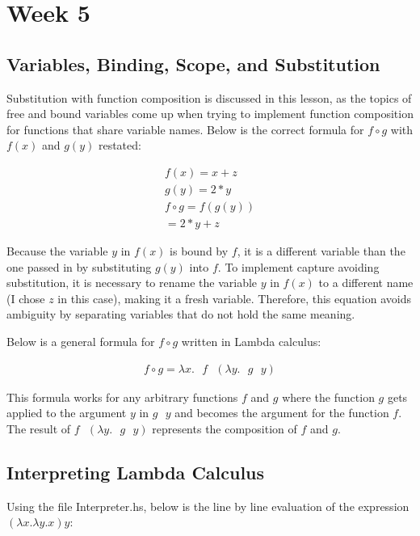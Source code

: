 \documentclass{article}
\theoremstyle{theorem}
\theoremstyle{definition}
\theoremstyle{remark}
\begin{document}
\section{Week 5}

\subsection{Variables, Binding, Scope, and Substitution}

Substitution with function composition is discussed in this lesson, as the topics of free and bound variables come up when trying to implement function composition for functions that share variable names. Below is the correct formula for $f \circ g$ with $f(x)$ and $g(y)$ restated:

\begin{align}
f(x) = x + z \\
g(y) = 2 * y \\
f \circ g = f(g(y)) \\
= 2 * y + z
\end{align}

Because the variable $y$ in $f(x)$ is bound by $f$, it is a different variable than the one passed in by substituting $g(y)$ into $f$. To implement capture avoiding substitution, it is necessary to rename the variable $y$ in $f(x)$ to a different name (I chose $z$ in this case), making it a fresh variable. Therefore, this equation avoids ambiguity by separating variables that do not  hold the same meaning.

Below is a general formula for $f \circ g$ written in Lambda calculus:

\begin{align}
f \circ g = \lambda x. \text{ } f\text{ } (\lambda y. \text{ } g \text{ } y)
\end{align}

This formula works for any arbitrary functions $f$ and $g$ where the function $g$ gets applied to the argument $y$ in $g \text{ } y$ and becomes the argument for the function $f$. The result of $f \text{ } (\lambda y. \text{ } g \text{ } y)$ represents the composition of $f$ and $g$.

\subsection{Interpreting Lambda Calculus}

Using the file Interpreter.hs, below is the line by line evaluation of the expression $(\lambda x. \lambda y. x)y$:
\end{document}
